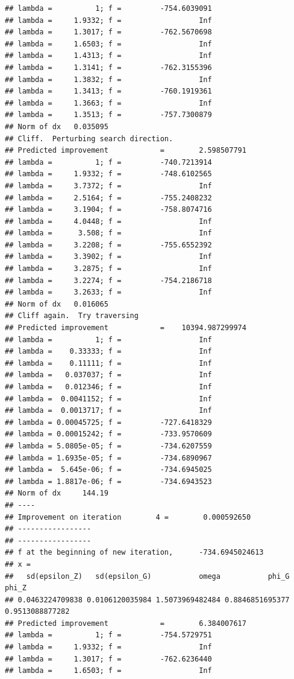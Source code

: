 \documentclass[12pt,a4paper,]{article}
\newcommand{\0}{\mathbf{0}}
\begin{document}
\begin{verbatim}
## lambda =          1; f =         -754.6039091 
## lambda =     1.9332; f =                  Inf 
## lambda =     1.3017; f =         -762.5670698 
## lambda =     1.6503; f =                  Inf 
## lambda =     1.4313; f =                  Inf 
## lambda =     1.3141; f =         -762.3155396 
## lambda =     1.3832; f =                  Inf 
## lambda =     1.3413; f =         -760.1919361 
## lambda =     1.3663; f =                  Inf 
## lambda =     1.3513; f =         -757.7300879 
## Norm of dx   0.035095
## Cliff.  Perturbing search direction. 
## Predicted improvement            =        2.598507791
## lambda =          1; f =         -740.7213914 
## lambda =     1.9332; f =         -748.6102565 
## lambda =     3.7372; f =                  Inf 
## lambda =     2.5164; f =         -755.2408232 
## lambda =     3.1904; f =         -758.8074716 
## lambda =     4.0448; f =                  Inf 
## lambda =      3.508; f =                  Inf 
## lambda =     3.2208; f =         -755.6552392 
## lambda =     3.3902; f =                  Inf 
## lambda =     3.2875; f =                  Inf 
## lambda =     3.2274; f =         -754.2186718 
## lambda =     3.2633; f =                  Inf 
## Norm of dx   0.016065
## Cliff again.  Try traversing
## Predicted improvement            =    10394.987299974
## lambda =          1; f =                  Inf 
## lambda =    0.33333; f =                  Inf 
## lambda =    0.11111; f =                  Inf 
## lambda =   0.037037; f =                  Inf 
## lambda =   0.012346; f =                  Inf 
## lambda =  0.0041152; f =                  Inf 
## lambda =  0.0013717; f =                  Inf 
## lambda = 0.00045725; f =         -727.6418329 
## lambda = 0.00015242; f =         -733.9570609 
## lambda = 5.0805e-05; f =         -734.6207559 
## lambda = 1.6935e-05; f =         -734.6890967 
## lambda =  5.645e-06; f =         -734.6945025 
## lambda = 1.8817e-06; f =         -734.6943523 
## Norm of dx     144.19
## ----
## Improvement on iteration        4 =        0.000592650
## -----------------
## -----------------
## f at the beginning of new iteration,      -734.6945024613 
## x =
##   sd(epsilon_Z)   sd(epsilon_G)           omega           phi_G           phi_Z 
## 0.0463224709838 0.0106120035984 1.5073969482484 0.8846851695377 0.9513088877282 
## Predicted improvement            =        6.384007617
## lambda =          1; f =         -754.5729751 
## lambda =     1.9332; f =                  Inf 
## lambda =     1.3017; f =         -762.6236440 
## lambda =     1.6503; f =                  Inf 

\end{verbatim}
\end{document}
